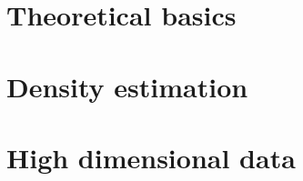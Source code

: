 \documentclass[12pt,a4paper]{amsart}
\theoremstyle{definition}
\theoremstyle{remark}
\numberwithin{equation}{section}
\begin{document}
\section{Theoretical basics}



\section{Density estimation}

\section{High dimensional data}



\end{document}
